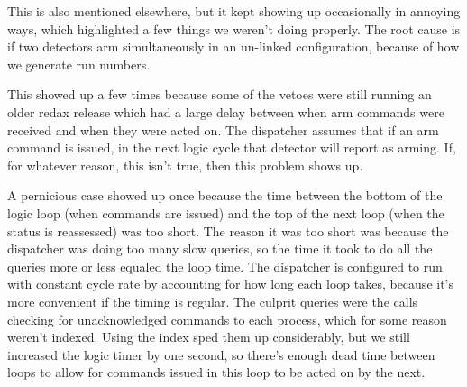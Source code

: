 This is also mentioned elsewhere, but it kept showing up occasionally in annoying ways, which highlighted a few things we weren't doing properly.
The root cause is if two detectors arm simultaneously in an un-linked configuration, because of how we generate run numbers.

This showed up a few times because some of the vetoes were still running an older redax release which had a large delay between when arm commands were received and when they were acted on.
The dispatcher assumes that if an arm command is issued, in the next logic cycle that detector will report as arming.
If, for whatever reason, this isn't true, then this problem shows up.

A pernicious case showed up once because the time between the bottom of the logic loop (when commands are issued) and the top of the next loop (when the status is reassessed) was too short.
The reason it was too short was because the dispatcher was doing too many slow queries, so the time it took to do all the queries more or less equaled the loop time.
The dispatcher is configured to run with constant cycle rate by accounting for how long each loop takes, because it's more convenient if the timing is regular.
The culprit queries were the calls checking for unacknowledged commands to each process, which for some reason weren't indexed.
Using the index sped them up considerably, but we still increased the logic timer by one second, so there's enough dead time between loops to allow for commands issued in this loop to be acted on by the next.

